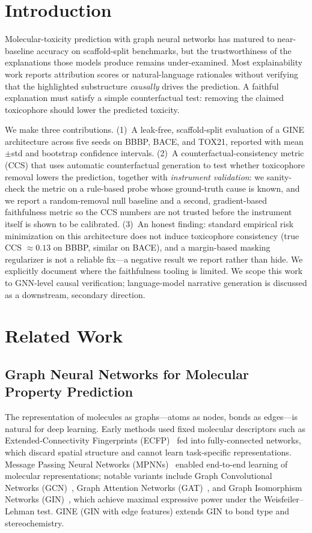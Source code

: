 \documentclass[journal]{IEEEtran}
\begin{document}
\section{Introduction}
Molecular-toxicity prediction with graph neural networks has matured to
near-baseline accuracy on scaffold-split benchmarks, but the trustworthiness of
the explanations those models produce remains under-examined. Most explainability
work reports attribution scores or natural-language rationales without verifying
that the highlighted substructure \emph{causally} drives the prediction. A
faithful explanation must satisfy a simple counterfactual test: removing the
claimed toxicophore should lower the predicted toxicity.

We make three contributions. (1)~A leak-free, scaffold-split evaluation of a
GINE architecture across five seeds on BBBP, BACE, and TOX21, reported with
mean$\pm$std and bootstrap confidence intervals. (2)~A counterfactual-consistency
metric (CCS) that uses automatic counterfactual generation to test whether
toxicophore removal lowers the prediction, together with \emph{instrument
validation}: we sanity-check the metric on a rule-based probe whose ground-truth
cause is known, and we report a random-removal null baseline and a second,
gradient-based faithfulness metric so the CCS numbers are not trusted before the
instrument itself is shown to be calibrated. (3)~An honest finding: standard
empirical risk minimization on this architecture does not induce toxicophore
consistency (true CCS $\approx 0.13$ on BBBP, similar on BACE), and a
margin-based masking regularizer is not a reliable fix---a negative result we
report rather than hide. We explicitly document where the faithfulness tooling is
limited. We scope this work to GNN-level causal verification; language-model
narrative generation is discussed as a downstream, secondary direction.

\section{Related Work}
\subsection{Graph Neural Networks for Molecular Property Prediction}
The representation of molecules as graphs---atoms as nodes, bonds as
edges---is natural for deep learning. Early methods used fixed molecular
descriptors such as Extended-Connectivity Fingerprints (ECFP)~\cite{rogers2010extended}
fed into fully-connected networks, which discard spatial structure and cannot
learn task-specific representations. Message Passing Neural Networks
(MPNNs)~\cite{gilmer2017neural} enabled end-to-end learning of molecular
representations; notable variants include Graph Convolutional Networks
(GCN)~\cite{kipf2017semi}, Graph Attention Networks (GAT)~\cite{velivckovic2018graph},
and Graph Isomorphism Networks (GIN)~\cite{xu2019powerful}, which achieve maximal
expressive power under the Weisfeiler--Lehman test. GINE (GIN with edge features)
extends GIN to bond type and stereochemistry.
\end{document}
